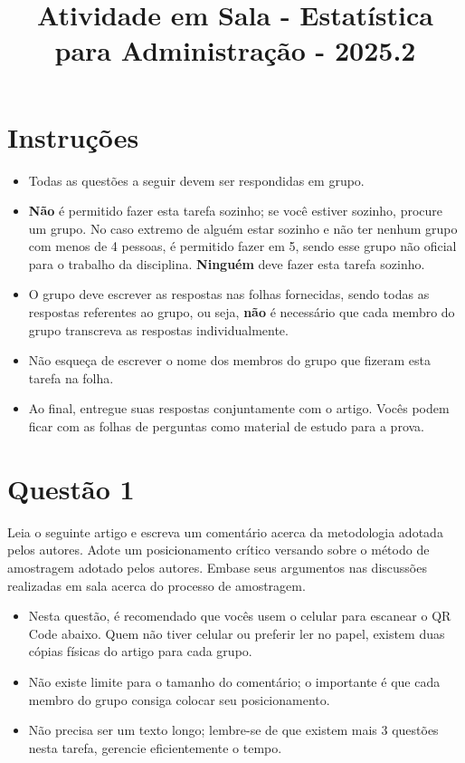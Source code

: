 \documentclass[12pt]{article}
\title{Atividade em Sala - Estatística para Administração - 2025.2}
\date{}
\begin{document}
\maketitle

\section*{Instruções}
\begin{itemize}
    \item Todas as questões a seguir devem ser respondidas em grupo.
    \item \textbf{Não} é permitido fazer esta tarefa sozinho; se você estiver sozinho, procure um grupo. No caso extremo de alguém estar sozinho e não ter nenhum grupo com menos de 4 pessoas,
    é permitido fazer em 5, sendo esse grupo não oficial para o trabalho da disciplina. \textbf{Ninguém} deve fazer esta tarefa sozinho. 
    \item O grupo deve escrever as respostas nas folhas fornecidas, sendo todas as respostas referentes ao grupo, ou seja, \textbf{não} é necessário que cada 
    membro do grupo transcreva as respostas individualmente. 
    \item Não esqueça de escrever o nome dos membros do grupo que fizeram esta tarefa na folha. 
    \item Ao final, entregue suas respostas conjuntamente com o artigo. Vocês podem ficar com as folhas de perguntas como material de estudo para a prova.  
\end{itemize}

\section*{Questão 1}
Leia o seguinte artigo e escreva um comentário acerca da metodologia adotada pelos autores. Adote um posicionamento crítico versando sobre 
o método de amostragem adotado pelos autores. Embase seus argumentos nas discussões realizadas em sala acerca do processo de amostragem. 

\begin{itemize}
    \item Nesta questão, é recomendado que vocês usem o celular para escanear o QR Code abaixo. Quem não tiver celular ou preferir ler no papel,
existem duas cópias físicas do artigo para cada grupo. 
    \item Não existe limite para o tamanho do comentário; o importante é que cada membro do grupo consiga colocar seu posicionamento.
    \item Não precisa ser um texto longo; lembre-se de que existem mais 3 questões nesta tarefa, gerencie eficientemente o tempo.  
\end{itemize}
\end{document}
